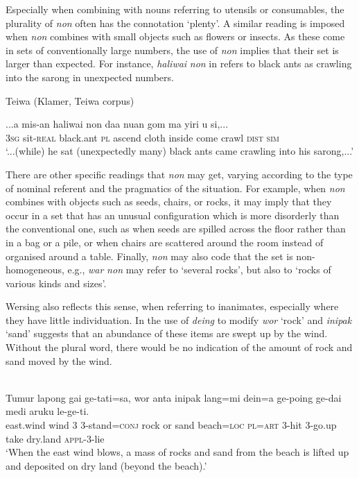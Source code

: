 Especially when combining with nouns referring to utensils or consumables, the plurality of \textit{non} often has the connotation `plenty'. A similar reading is imposed when \textit{non} combines with small objects such as flowers or insects. As these come in sets of conventionally large numbers, the use of \textit{non} implies that their set is larger than expected. For instance, \textit{haliwai} \textit{non} in  refers to black ants as crawling into the sarong in unexpected numbers.

Teiwa (Klamer, Teiwa corpus)

\ea%
\label{ex:9:74}
\gll ...a mis-an haliwai non daa nuan gom ma yiri  u si,... \\
  \textsc{3sg} sit-\textsc{real} black.ant \textsc{pl} ascend cloth inside come crawl \textsc{dist} \textsc{sim}  \\
\glt `...(while) he sat (unexpectedly many) black ants came crawling into his sarong,...'
\z






There are other specific readings that \textit{non} may get, varying according to the type of nominal referent and the pragmatics of the situation. For example, when \textit{non} combines with objects such as seeds, chairs, or rocks, it may imply that they occur in a set that has an unusual configuration which is more disorderly than the conventional one, such as when seeds are spilled across the floor rather than in a bag or a pile, or when chairs are scattered around the room instead of organised around a table. Finally, \textit{non} may also code that the set is non-homogeneous, e.g., \textit{war} \textit{non} may refer to `several rocks', but also to `rocks of various kinds and sizes'.

Wersing also reflects this sense, when referring to inanimates, especially where they have little individuation. In  the use of \textit{deing} to modify \textit{wor} `rock' and \textit{inipak} `sand' suggests that an abundance of these items are swept up by the wind. Without the plural word, there would be no indication of the amount of rock and sand moved by the wind.


\ea%
\label{ex:9:75}
 \\
\gll  Tumur lapong gai ge-tati=sa, wor anta inipak lang=mi dein=a ge-poing ge-dai medi aruku le-ge-ti.   \\
  east.wind wind 3 3-stand=\textsc{conj} rock or sand beach=\textsc{loc}   \textsc{pl=art} \textsc{3-}hit 3-go.up take dry.land \textsc{appl-3-}lie \\
\glt `When the east wind blows, a mass of rocks and sand from the beach is lifted up and deposited on dry land (beyond the beach).'
\z










